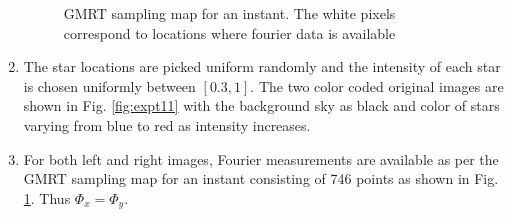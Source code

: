 \begin{enumerate}
\begin{figure}[H]
	 \caption[GMRT sampling map for an instant ]{\small GMRT sampling map for an instant. The white pixels correspond to locations where fourier data is available}
	\label{fig:expt12}
\end{figure}

\item The star locations are picked uniform randomly and the intensity of each star is chosen uniformly between $[0.3, 1]$. The two color coded original images are shown in Fig. \ref{fig:expt11} with the background sky as black and color of stars varying from blue to red as intensity increases.


\item For both left and right images, Fourier measurements are available as per the GMRT sampling map for an instant consisting of 746 points as shown in Fig. \ref{fig:expt12}.  Thus $\Phi_x = \Phi_y$.


\end{enumerate}
